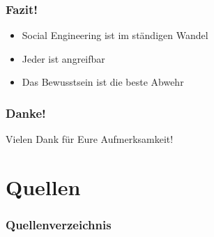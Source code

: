 \documentclass{beamer}
\begin{document}
\begin{frame}
    \frametitle{Fazit!}
    \Large{
        \begin{itemize}
            \item Social Engineering ist im ständigen Wandel
            \item Jeder ist angreifbar
            \item Das Bewusstsein ist die beste Abwehr
        \end{itemize}
    }
\end{frame}

\begin{frame}
    \frametitle{Danke!}
    \begin{center}
        \LARGE{Vielen Dank für Eure Aufmerksamkeit!}
    \end{center}
\end{frame}

\section{Quellen}

\begin{frame}[allowframebreaks]
    \frametitle{Quellenverzeichnis}
    
    
\end{frame}
\end{document}
